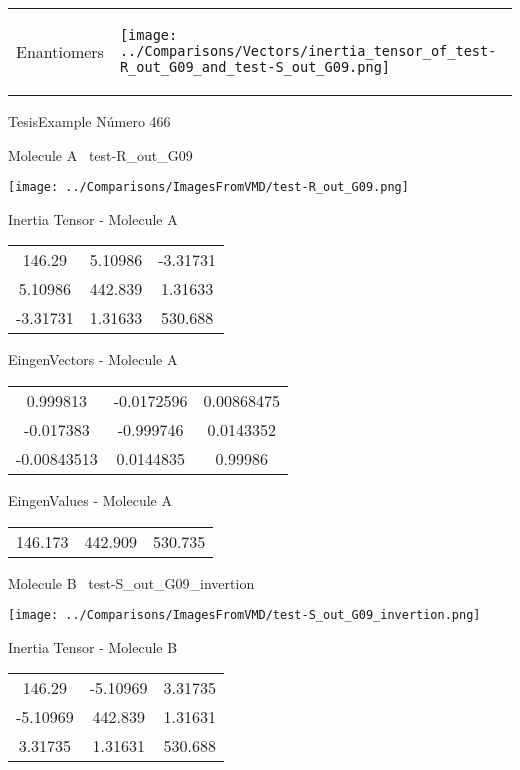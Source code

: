 \vtab[-5mm]
\begin{tabular}{*{2}{m{}}}
\begin{center}
\textcolor{NavyBlue}{\Large Enantiomers}
\end{center}
&
\begin{center}
\texttt{[image: ../Comparisons/Vectors/inertia\_tensor\_of\_test-R\_out\_G09\_and\_test-S\_out\_G09.png]}
\end{center}
\end{tabular}

 \newpage

\vtab[-3cm]
\begin{center}
{\large TesisExample \tab Número 466}
\end{center}
\begin{multicols}{2}
\begin{center}

Molecule A \
test-R\_out\_G09

\texttt{[image: ../Comparisons/ImagesFromVMD/test-R\_out\_G09.png]}

Inertia Tensor - Molecule A \\
\begin{tabular}{|c c c|}
146.29	 & 	5.10986	 & 	-3.31731	 \\
5.10986	 & 	442.839	 & 	1.31633	 \\
-3.31731	 & 	1.31633	 & 	530.688
\end{tabular}

\vtab
 EingenVectors - Molecule A     \\
\begin{tabular}{|c c c|}
0.999813	 & 	-0.0172596	 & 	0.00868475	 \\
-0.017383	 & 	-0.999746	 & 	0.0143352	 \\
-0.00843513	 & 	0.0144835	 & 	0.99986
\end{tabular}

\vtab
 EingenValues - Molecule A     \\
\begin{tabular}{|c c c|}
146.173	 & 	442.909	 & 	530.735	 \\
\end{tabular}
\columnbreak

Molecule B \
test-S\_out\_G09\_invertion

\texttt{[image: ../Comparisons/ImagesFromVMD/test-S\_out\_G09\_invertion.png]}

Inertia Tensor - Molecule B \\
\begin{tabular}{|c c c|}
146.29	 & 	-5.10969	 & 	3.31735	 \\
-5.10969	 & 	442.839	 & 	1.31631	 \\
3.31735	 & 	1.31631	 & 	530.688
\end{tabular}


\end{center}
\end{multicols}
